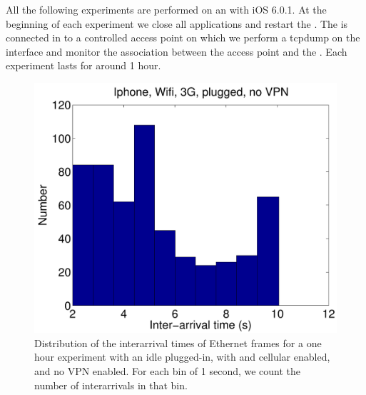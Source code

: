 All the following experiments are performed on an  with iOS
6.0.1.  At the beginning of each experiment we close all applications
and restart the \iphone{}. The \iphone{} is connected in \wifi{} to a
controlled access point on which we perform a tcpdump on the \wifi{}
interface and monitor the \wifi{} association between the access point
and the \iphone{}. Each experiment lasts for around 1 hour. 

\begin{figure}
\centering
        \includegraphics[width=0.8\linewidth]{../../code/pushNotification/Fig/bw_iphone_wifi_3g_plug_novpn_interTs.pdf}
  \caption{Distribution of the interarrival times of Ethernet frames
    for a one hour experiment with an idle \iphone{} plugged-in, with \wifi{} and cellular
    enabled, and no VPN enabled. For each bin of 1 second, we count
    the number of interarrivals in that bin.}
  \label{fig:push_w3p_interTs}
  \vspace{\postfigspace}
\end{figure}



